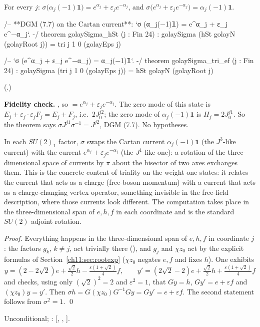 \begin{theorem}\label{ch11:thm:sigmah}
For every $j$: $\sigma\big(\alpha_j(-1)\mathbf 1\big)=e^{\alpha_j}+\varepsilon_je^{-\alpha_j}$, and
$\sigma\big(e^{\alpha_j}+\varepsilon_je^{-\alpha_j}\big)=\alpha_j(-1)\mathbf 1$.
\end{theorem}
\begin{leancode}
/-- **DGM (7.7) on the Cartan current**: `σ (α_j(−1)𝟙) = e^{α_j} + ε_j e^{−α_j}`. -/
theorem golaySigma_hSt (j : Fin 24) :
    golaySigma (hSt golayN (golayRoot j)) = tri j 1 0 (golayEps j)

/-- `σ (e^{α_j} + ε_j e^{−α_j}) = α_j(−1)𝟙`. -/
theorem golaySigma_tri_ef (j : Fin 24) :
    golaySigma (tri j 1 0 (golayEps j)) = hSt golayN (golayRoot j)
\end{leancode}
(.)
\begin{dictionary}
\textbf{Fidelity check.}  , so
 $=e^{\alpha_j}+\varepsilon_je^{-\alpha_j}$.  The zero mode of this state
is $E_j+\varepsilon_j\cdot\varepsilon_jF_j=E_j+F_j$, i.e.\ $2J^{j2}_0$; the zero mode of
$\alpha_j(-1)\mathbf 1$ is $H_j=2J^{j1}_0$.  So the theorem says $\sigma J^{j1}\sigma^{-1}=J^{j2}$,
DGM (7.7).  No hypotheses.
\end{dictionary}

\begin{physics}
In each $SU(2)_1$ factor, $\sigma$ swaps the Cartan current $\alpha_j(-1)\mathbf 1$ (the $J^3$-like current) with the current $e^{\alpha_j}+\varepsilon_je^{-\alpha_j}$ (the $J^1$-like one): a rotation of the three-dimensional space of currents by $\pi$ about the bisector of two axes exchanges them. This is the concrete content of triality on the weight-one states: it relates the current that acts as a charge (free-boson momentum) with a current that acts as a charge-changing vertex operator, something invisible in the free-field description, where those currents look different. The computation takes place in the three-dimensional span of $e,h,f$ in each coordinate and is the standard $SU(2)$ adjoint rotation.
\end{physics}
\emph{Proof.}  Everything happens in the three-dimensional span of $e,h,f$ in coordinate $j$: the
factors $g_k$, $k\ne j$, act trivially there (), and $g_j$ and $\chi z_0$
act by the explicit formulas of Section~\ref{ch11:sec:rootexp} ($\chi z_0$ negates $e,f$ and fixes
$h$).  One exhibits
\begin{equation*}
  y=(2-2\sqrt2)e+\tfrac{\sqrt2}2h-\tfrac{\varepsilon(1+\sqrt2)}4f,\qquad
  y'=(2\sqrt2-2)e+\tfrac{\sqrt2}2h+\tfrac{\varepsilon(1+\sqrt2)}4f
\end{equation*}
and checks, using only $(\sqrt2)^2=2$ and $\varepsilon^2=1$, that $Gy=h$, $Gy'=e+\varepsilon f$ and
$(\chi z_0)y=y'$.  Then $\sigma h=G(\chi z_0)G^{-1}Gy=Gy'=e+\varepsilon f$.  The second statement
follows from $\sigma^2=1$. \qed
\begin{status}Unconditional; : [,
, ].\end{status}

